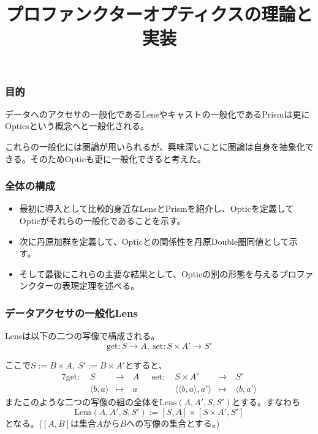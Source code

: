 \documentclass[uplatex,dvipdfmx]{beamer}
\title{プロファンクターオプティクスの理論と実装}
\newcommand{\arrow}{\rightarrow}
\newcommand{\tuple}[1]{\langle #1\rangle}
\newcommand{\mor}[3]{#1:#2\arrow #3}
\newcommand{\inset}[2]{[#1,#2]}
\begin{document}
  \begin{frame}
    \titlepage
  \end{frame}
  \begin{frame}\frametitle{目的}

    データへのアクセサの一般化であるLensやキャストの一般化であるPrismは更にOpticsという概念へと一般化される。\\
    \vspace{\baselineskip}

    これらの一般化には圏論が用いられるが、興味深いことに圏論は自身を抽象化できる。そのためOpticも更に一般化できると考えた。    
  \end{frame}
  \begin{frame}\frametitle{全体の構成}
    \begin{itemize}
      \item 最初に導入として比較的身近なLensとPrismを紹介し、Opticを定義してOpticがそれらの一般化であることを示す。\\
      \vspace{\baselineskip}
      \item 次に丹原加群を定義して、Opticとの関係性を丹原Double圏同値として示す。\\
      \vspace{\baselineskip}
      \item そして最後にこれらの主要な結果として、Opticの別の形態を与えるプロファンクターの表現定理を述べる。
    \end{itemize}
  \end{frame}
  \begin{frame}\frametitle{データアクセサの一般化Lens}
    \begin{definition}[Lens]
      Lensは以下の二つの写像で構成される。
      \[\mor{\mathrm{get}}{S}{A},\ \mor{\mathrm{set}}{S\times A'}{S'}\]
    \end{definition}
    ここで$S:=B\times A,\ S':=B\times A'$とすると、
    \begin{alignat*}{7}
      \mathrm{get}:\ &S\ &\longrightarrow \ &A \ \ \ &\mathrm{set}:\ &S\times A'\ &\longrightarrow \ &S'\\
      &\tuple{b,a}&\longmapsto\ &a      &&\tuple{\tuple{b,a},a'}&\longmapsto\ &\tuple{b, a'}
    \end{alignat*}
    またこのような二つの写像の組の全体を$\mathrm{Lens}(A,A',S,S')$とする。すなわち\[\mathrm{Lens}(A,A',S,S') := \inset{S}{A}\times \inset{S\times A'}{S'}\]となる。($\inset{A}{B}$は集合$A$から$B$への写像の集合とする。)
  \end{frame}
\end{document}
